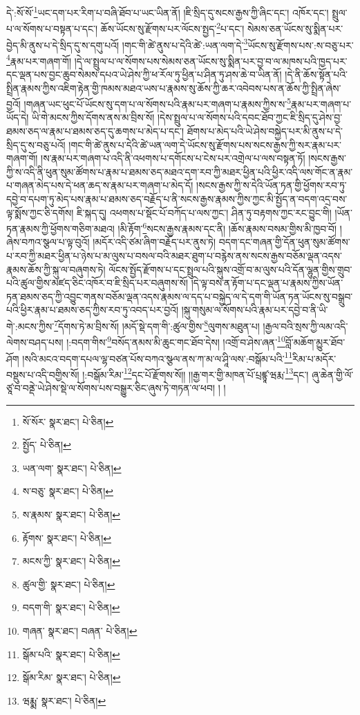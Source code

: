 དེ་:སོ་སོ་\footnote{སོ་སོར་  སྣར་ཐང་།  པེ་ཅིན། }ཡང་དག་པར་རིག་པ་བཞི་ཐོབ་པ་ཡང་ཡིན་ནོ། །ཇི་སྲིད་དུ་སངས་རྒྱས་ཀྱི་ཞིང་དང་། འཁོར་དང་། སྤྲུལ་པ་ལ་སོགས་པ་བསྟན་པ་དང་། ཆོས་ཡོངས་སུ་རྫོགས་པར་ལོངས་སྤྱད་\footnote{སྤྱོད་  པེ་ཅིན། }པ་དང་། སེམས་ཅན་ཡོངས་སུ་སྨིན་པར་བྱེད་མི་ནུས་པ་དེ་སྲིད་དུ་ས་དགུ་པའོ། །གང་གི་ཚེ་ནུས་པ་དེའི་ཚེ་:ཡན་ལག་དེ་\footnote{ཡན་ལག་  སྣར་ཐང་།  པེ་ཅིན། }ཡོངས་སུ་རྫོགས་པས་:ས་བཅུ་པར་\footnote{ས་བཅུ་  སྣར་ཐང་།  པེ་ཅིན། }རྣམ་པར་གཞག་གོ། །དེ་ལ་སྤྲུལ་པ་ལ་སོགས་པས་སེམས་ཅན་ཡོངས་སུ་སྨིན་པར་བྱ་བ་ལ་མཁས་པའི་ཁྱད་པར་དང་ལྡན་པས་བྱང་ཆུབ་སེམས་དཔའ་ཡེ་ཤེས་ཀྱི་ཕ་རོལ་ཏུ་ཕྱིན་པ་ཤིན་ཏུ་ཤས་ཆེ་བ་ཡིན་ནོ། །དེ་ནི་ཆོས་སྟོན་པའི་སྤྲིན་རྣམས་ཀྱིས་འཇིག་རྟེན་གྱི་ཁམས་མཐའ་ཡས་པ་རྣམས་སུ་ཆོས་ཀྱི་ཆར་འབེབས་པས་ན་ཆོས་ཀྱི་སྤྲིན་ཞེས་བྱའོ། །གཞན་ཡང་ཕུང་པོ་ཡོངས་སུ་དག་པ་ལ་སོགས་པའི་རྣམ་པར་གཞག་པ་རྣམས་ཀྱིས་ས་\footnote{ས་རྣམས་  སྣར་ཐང་།  པེ་ཅིན། }རྣམ་པར་གཞག་པ་ཡོད་དེ། ཡི་གེ་མངས་ཀྱིས་དོགས་ནས་མ་བྲིས་སོ། །དེས་སྤྲུལ་པ་ལ་སོགས་པའི་དབང་ཐོབ་ཀྱང་ཇི་སྲིད་དུ་ཤེས་བྱ་ཐམས་ཅད་ལ་རྣམ་པ་ཐམས་ཅད་དུ་ཆགས་པ་མེད་པ་དང་། ཐོགས་པ་མེད་པའི་ཡེ་ཤེས་བསྐྱེད་པར་མི་ནུས་པ་དེ་སྲིད་དུ་ས་བཅུ་པའོ། །གང་གི་ཚེ་ནུས་པ་དེའི་ཚེ་ཡན་ལག་དེ་ཡོངས་སུ་རྫོགས་པས་སངས་རྒྱས་ཀྱི་སར་རྣམ་པར་གཞག་གོ། །ས་རྣམ་པར་གཞག་པ་འདི་ནི་འཕགས་པ་དགོངས་པ་ངེས་པར་འགྲེལ་པ་ལས་བསྟན་ཏོ། །སངས་རྒྱས་ཀྱི་ས་འདི་ནི་ཕུན་སུམ་ཚོགས་པ་རྣམ་པ་ཐམས་ཅད་མཐའ་དག་རབ་ཀྱི་མཐར་ཕྱིན་པའི་ཕྱིར་འདི་ལས་གོང་ན་རྣམ་པ་གཞན་མེད་པས་དེ་ཕན་ཆད་ས་རྣམ་པར་གཞག་པ་མེད་དོ། །སངས་རྒྱས་ཀྱི་ས་དེའི་ཡོན་ཏན་གྱི་ཕྱོགས་རབ་ཏུ་དབྱེ་བ་དཔག་ཏུ་མེད་པས་རྣམ་པ་ཐམས་ཅད་བརྗོད་པ་ནི་སངས་རྒྱས་རྣམས་ཀྱིས་ཀྱང་མི་སྤྱོད་ན་བདག་འདྲ་བས་ལྟ་སྨོས་ཀྱང་ཅི་དགོས། ཇི་སྐད་དུ། འཕགས་པ་སྡོང་པོ་བཀོད་པ་ལས་ཀྱང་། ཤིན་ཏུ་བརྟགས་ཀྱང་རང་བྱུང་གི། །ཡོན་ཏན་རྣམས་ཀྱི་ཕྱོགས་གཅིག་མཐའ། །མི་རྟོག་\footnote{རྟོགས་  སྣར་ཐང་།  པེ་ཅིན། }སངས་རྒྱས་རྣམས་དང་ནི། །ཆོས་རྣམས་བསམ་གྱིས་མི་ཁྱབ་བོ། །ཞེས་བཀའ་སྩལ་པ་ལྟ་བུའོ། །མདོར་འདི་ཙམ་ཞིག་བརྗོད་པར་ནུས་ཏེ། བདག་དང་གཞན་གྱི་དོན་ཕུན་སུམ་ཚོགས་པ་རབ་ཀྱི་མཐར་ཕྱིན་པ་ཉེས་པ་མ་ལུས་པ་བསལ་བའི་མཐར་ཐུག་པ་བརྙེས་ནས་སངས་རྒྱས་བཅོམ་ལྡན་འདས་རྣམས་ཆོས་ཀྱི་སྐུ་ལ་བཞུགས་ཏེ། ལོངས་སྤྱོད་རྫོགས་པ་དང་སྤྲུལ་པའི་སྐུས་འགྲོ་བ་མ་ལུས་པའི་དོན་ལྷུན་གྱིས་གྲུབ་པའི་ཚུལ་གྱིས་མཛད་ཅིང་འཁོར་བ་ཇི་སྲིད་པར་བཞུགས་སོ། །དེ་ལྟ་བས་ན་རྟོག་པ་དང་ལྡན་པ་རྣམས་ཀྱིས་ཡོན་ཏན་ཐམས་ཅད་ཀྱི་འབྱུང་གནས་བཅོམ་ལྡན་འདས་རྣམས་ལ་དད་པ་བསྐྱེད་ལ་དེ་དག་གི་ཡོན་ཏན་ཡོངས་སུ་བསྒྲུབ་པའི་ཕྱིར་རྣམ་པ་ཐམས་ཅད་ཀྱིས་རབ་ཏུ་འབད་པར་བྱའོ། །སྐུ་གསུམ་ལ་སོགས་པའི་རྣམ་པར་དབྱེ་བ་ནི་ཡི་གེ་:མངས་ཀྱིས་\footnote{མངས་ཀྱི་  སྣར་ཐང་།  པེ་ཅིན། }དོགས་ཏེ་མ་བྲིས་སོ། །མདོ་སྡེ་དག་གི་:ཚུལ་གྱིས་\footnote{ཚུལ་གྱི་  སྣར་ཐང་།  པེ་ཅིན། }ལུགས་མཐུན་པ། །རྒྱལ་བའི་སྲས་ཀྱི་ལམ་འདི་ལེགས་བཤད་པས། །:བདག་གིས་\footnote{བདག་གི་  སྣར་ཐང་།  པེ་ཅིན། }བསོད་ནམས་མི་ཆུང་གང་ཐོབ་དེས། །འགྲོ་བ་ཤེས་ཞན་\footnote{གཞན་  སྣར་ཐང་། བཞན་  པེ་ཅིན། }བློ་མཆོག་མྱུར་ཐོབ་ཤོག །སའི་མངའ་བདག་དཔལ་ལྷ་བཙན་པོས་བཀའ་སྩལ་ནས་ཀ་མ་ལ་ཤཱི་ལས་:བསྒོམ་པའི་\footnote{སྒོམ་པའི་  སྣར་ཐང་།  པེ་ཅིན། }རིམ་པ་མདོར་བསྡུས་པ་འདི་བགྱིས་སོ། །:བསྒོམ་རིམ་\footnote{སྒོམ་རིམ་  སྣར་ཐང་།  པེ་ཅིན། }དང་པོ་རྫོགས་སོ།། །།རྒྱ་གར་གྱི་མཁན་པོ་པྲཛྙཱ་ཝརྨ་\footnote{ཝརྨྨ་  སྣར་ཐང་།  པེ་ཅིན། }དང་། ཞུ་ཆེན་གྱི་ལོ་ཙཱ་བ་བནྡེ་ཡེ་ཤེས་སྡེ་ལ་སོགས་པས་བསྒྱུར་ཅིང་ཞུས་ཏེ་གཏན་ལ་ཕབ། ། །